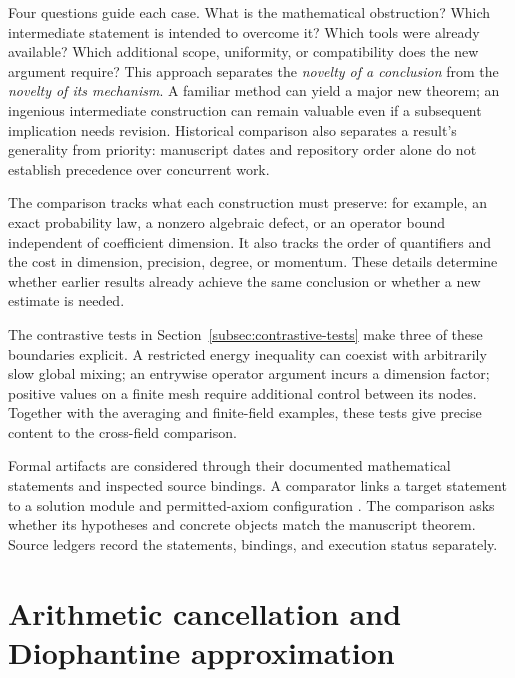 \documentclass[11pt]{article}
\begin{document}
Four questions guide each case. What is the mathematical obstruction?
Which intermediate statement is intended to overcome it? Which tools were
already available? Which additional scope, uniformity, or compatibility
does the new argument require? This approach separates the \emph{novelty
of a conclusion} from the \emph{novelty of its mechanism}. A familiar
method can yield a major new theorem; an ingenious intermediate
construction can remain valuable even if a subsequent implication needs
revision. Historical comparison also separates a result's generality
from priority: manuscript dates and repository order alone do not
establish precedence over concurrent work.

The comparison tracks what each construction must preserve: for example,
an exact probability law, a nonzero algebraic defect, or an operator bound
independent of coefficient dimension. It also tracks the order of
quantifiers and the cost in dimension, precision, degree, or momentum.
These details determine whether earlier results already achieve the same
conclusion or whether a new estimate is needed.

The contrastive tests in Section~\ref{subsec:contrastive-tests} make three
of these boundaries explicit. A restricted energy inequality can coexist
with arbitrarily slow global mixing; an entrywise operator argument incurs
a dimension factor; positive values on a finite mesh require additional
control between its nodes. Together with the averaging and finite-field
examples, these tests give precise content to the cross-field comparison.

Formal artifacts are considered through their documented mathematical
statements and inspected source bindings. A comparator links a target
statement to a solution module and permitted-axiom configuration
\citep{OpenAIComparator}. The comparison asks whether its hypotheses
and concrete objects match the manuscript theorem. Source ledgers record
the statements, bindings, and execution status separately.

\section{Arithmetic cancellation and Diophantine approximation}

\end{document}
